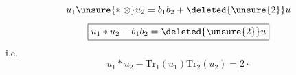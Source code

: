 \[u_1\unsure{\ast|\otimes}u_2=b_1b_2+\deleted{\unsure{2}}u\]
\[\boxed{u_1\ast u_2-b_1b_2=\deleted{\unsure{2}}u}\]
i.e.
\[u_1\ast u_2-\mathrm{Tr}_1(u_1)\mathrm{Tr}_2(u_2)=2\cdot\]
